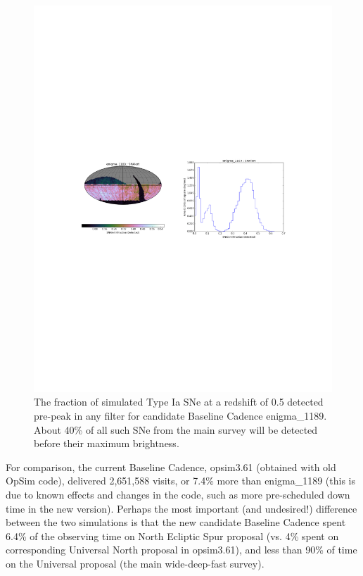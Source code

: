 \documentclass[manuscript]{article}
\begin{document}
\begin{figure}[t!]
\vskip -4.1in
\hskip -0.5in
\includegraphics[angle=0,width=1.19\hsize,clip]{enigma1189_earlySNe.pdf}
\vskip -4.0in
\caption{The fraction of simulated Type Ia SNe at a redshift of 0.5 detected 
pre-peak in any filter for candidate Baseline Cadence enigma\_1189. About 
40\% of all such SNe from the main survey will be detected before their 
maximum brightness.} 
\label{fig:enigmaEarlySNe}
\end{figure}


For comparison, the current Baseline Cadence, opsim3.61 (obtained with old OpSim code),
delivered 2,651,588 visits, or 7.4\% more than enigma\_1189  (this is due to known effects
and changes in the code,  such as more pre-scheduled down time in the new version). 
Perhaps the most important (and undesired!) difference between the two simulations
is that the new candidate Baseline Cadence spent 6.4\% of the observing time on North Ecliptic Spur 
proposal (vs. 4\% spent on corresponding Universal North proposal in opsim3.61), and less than 90\% of time
on the Universal proposal (the main wide-deep-fast survey). 
\end{document}
